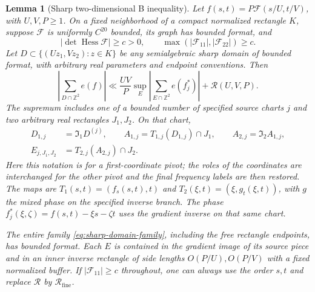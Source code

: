 \documentclass[11pt,a4paper]{article}
\numberwithin{equation}{section}
\newtheorem{lemma}[theorem]{Lemma}
\theoremstyle{remark}
\newcommand{\Z}{\mathbb Z}
\DeclareMathOperator{\Hess}{Hess}
\newcommand{\Rfine}{\mathcal R_{\mathrm{fine}}}
\begin{document}
\begin{lemma}[Sharp two-dimensional B inequality]\label{lem:sharpB}
Let $f(s,t)=P\mathcal F(s/U,t/V)$, with $U,V,P\ge1$.
On a fixed neighborhood of a compact normalized rectangle $K$, suppose
$\mathcal F$ is uniformly $C^{20}$ bounded, its graph has bounded format,
and
\[
 |\det\Hess\mathcal F|\ge c>0,\qquad
 \max(|\mathcal F_{11}|,|\mathcal F_{22}|)\ge c.
\]
Let $D\subset\{(Uz_1,Vz_2):z\in K\}$ be any semialgebraic sharp domain
of bounded format, with arbitrary real parameters and endpoint conventions.
Then
\begin{equation}\label{eq:sharpB}
 \left|\sum_{D\cap\Z^2}e(f)\right|
 \ll\frac{UV}{P}\sup_E\left|\sum_{E\cap\Z^2}e(f_j^*)\right|
       +\mathcal R(U,V,P).
\end{equation}
The supremum includes one of a bounded number of specified source charts
$j$ and two arbitrary real rectangles $J_1,J_2$. On that chart,
\begin{equation}\label{eq:sharp-domain-family}
 \begin{split}
 D_{1,j}&=\mathfrak I_1D^{(j)},\qquad
 A_{1,j}=T_{1,j}(D_{1,j})\cap J_1,\qquad
 A_{2,j}=\mathfrak I_2A_{1,j},\\
 E_{j,J_1,J_2}&=T_{2,j}(A_{2,j})\cap J_2.
 \end{split}
\end{equation}
Here this notation is for a first-coordinate pivot; the roles of the
coordinates are interchanged for the other pivot and the final frequency
labels are then restored. The maps are
$T_1(s,t)=(f_s(s,t),t)$ and $T_2(\xi,t)=(\xi,g_t(\xi,t))$, with $g$
the mixed phase on the specified inverse branch. The phase
$f_j^*(\xi,\zeta)=f(s,t)-\xi s-\zeta t$ uses the gradient inverse on
that same chart.

The entire family \eqref{eq:sharp-domain-family}, including the free
rectangle endpoints, has bounded format. Each $E$ is contained in the
gradient image of its source piece and in an inner inverse rectangle of
side lengths $O(P/U),O(P/V)$ with a fixed normalized buffer. If
$|\mathcal F_{11}|\ge c$ throughout, one can always use the order $s,t$
and replace $\mathcal R$ by $\Rfine$.
\end{lemma}
\end{document}
